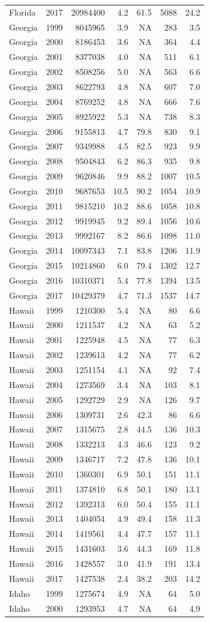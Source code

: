 \documentclass[
]{article}
\begin{document}
\begin{longtable}[]{@{}lrrrrrr@{}}
Florida & 2017 & 20984400 & 4.2 & 61.5 & 5088 & 24.2\tabularnewline
Georgia & 1999 & 8045965 & 3.9 & NA & 283 & 3.5\tabularnewline
Georgia & 2000 & 8186453 & 3.6 & NA & 364 & 4.4\tabularnewline
Georgia & 2001 & 8377038 & 4.0 & NA & 511 & 6.1\tabularnewline
Georgia & 2002 & 8508256 & 5.0 & NA & 563 & 6.6\tabularnewline
Georgia & 2003 & 8622793 & 4.8 & NA & 607 & 7.0\tabularnewline
Georgia & 2004 & 8769252 & 4.8 & NA & 666 & 7.6\tabularnewline
Georgia & 2005 & 8925922 & 5.3 & NA & 738 & 8.3\tabularnewline
Georgia & 2006 & 9155813 & 4.7 & 79.8 & 830 & 9.1\tabularnewline
Georgia & 2007 & 9349988 & 4.5 & 82.5 & 923 & 9.9\tabularnewline
Georgia & 2008 & 9504843 & 6.2 & 86.3 & 935 & 9.8\tabularnewline
Georgia & 2009 & 9620846 & 9.9 & 88.2 & 1007 & 10.5\tabularnewline
Georgia & 2010 & 9687653 & 10.5 & 90.2 & 1054 & 10.9\tabularnewline
Georgia & 2011 & 9815210 & 10.2 & 88.6 & 1058 & 10.8\tabularnewline
Georgia & 2012 & 9919945 & 9.2 & 89.4 & 1056 & 10.6\tabularnewline
Georgia & 2013 & 9992167 & 8.2 & 86.6 & 1098 & 11.0\tabularnewline
Georgia & 2014 & 10097343 & 7.1 & 83.8 & 1206 & 11.9\tabularnewline
Georgia & 2015 & 10214860 & 6.0 & 79.4 & 1302 & 12.7\tabularnewline
Georgia & 2016 & 10310371 & 5.4 & 77.8 & 1394 & 13.5\tabularnewline
Georgia & 2017 & 10429379 & 4.7 & 71.3 & 1537 & 14.7\tabularnewline
Hawaii & 1999 & 1210300 & 5.4 & NA & 80 & 6.6\tabularnewline
Hawaii & 2000 & 1211537 & 4.2 & NA & 63 & 5.2\tabularnewline
Hawaii & 2001 & 1225948 & 4.5 & NA & 77 & 6.3\tabularnewline
Hawaii & 2002 & 1239613 & 4.2 & NA & 77 & 6.2\tabularnewline
Hawaii & 2003 & 1251154 & 4.1 & NA & 92 & 7.4\tabularnewline
Hawaii & 2004 & 1273569 & 3.4 & NA & 103 & 8.1\tabularnewline
Hawaii & 2005 & 1292729 & 2.9 & NA & 126 & 9.7\tabularnewline
Hawaii & 2006 & 1309731 & 2.6 & 42.3 & 86 & 6.6\tabularnewline
Hawaii & 2007 & 1315675 & 2.8 & 44.5 & 136 & 10.3\tabularnewline
Hawaii & 2008 & 1332213 & 4.3 & 46.6 & 123 & 9.2\tabularnewline
Hawaii & 2009 & 1346717 & 7.2 & 47.8 & 136 & 10.1\tabularnewline
Hawaii & 2010 & 1360301 & 6.9 & 50.1 & 151 & 11.1\tabularnewline
Hawaii & 2011 & 1374810 & 6.8 & 50.1 & 180 & 13.1\tabularnewline
Hawaii & 2012 & 1392313 & 6.0 & 50.4 & 155 & 11.1\tabularnewline
Hawaii & 2013 & 1404054 & 4.9 & 49.4 & 158 & 11.3\tabularnewline
Hawaii & 2014 & 1419561 & 4.4 & 47.7 & 157 & 11.1\tabularnewline
Hawaii & 2015 & 1431603 & 3.6 & 44.3 & 169 & 11.8\tabularnewline
Hawaii & 2016 & 1428557 & 3.0 & 41.9 & 191 & 13.4\tabularnewline
Hawaii & 2017 & 1427538 & 2.4 & 38.2 & 203 & 14.2\tabularnewline
Idaho & 1999 & 1275674 & 4.9 & NA & 64 & 5.0\tabularnewline
Idaho & 2000 & 1293953 & 4.7 & NA & 64 & 4.9\tabularnewline

\end{longtable}
\end{document}
